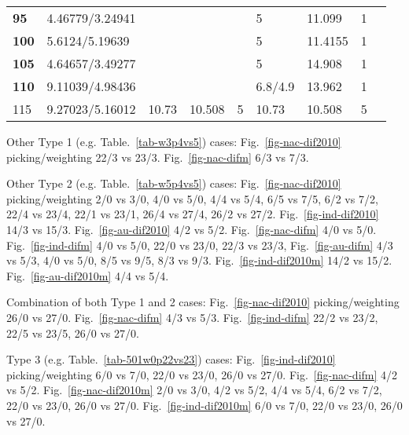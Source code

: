 \begin{table*}
\begin{tabular}{|l|l|l|l|l|l|l|l|l|l}
\textbf{95} & 4.46779/3.24941 & \multicolumn{3}{l|}{} & 5 & 11.099 & 1 & \multicolumn{2}{l|}{} \\ \cline{1-2} \cline{6-8}
\textbf{100} & 5.6124/5.19639 & \multicolumn{3}{l|}{} & 5 & 11.4155 & 1 & \multicolumn{2}{l|}{} \\ \cline{1-2} \cline{6-8}
\textbf{105} & 4.64657/3.49277 & \multicolumn{3}{l|}{} & 5 & 14.908 & 1 & \multicolumn{2}{l|}{} \\ \cline{1-2} \cline{6-8}
\textbf{110} & 9.11039/4.98436 & \multicolumn{3}{l|}{} & 6.8/4.9 & 13.962 & 1 & \multicolumn{2}{l|}{} \\ \cline{1-8}
115 & 9.27023/5.16012 & 10.73 & 10.508 & 5 & 10.73 & 10.508 & 5 & \multicolumn{2}{l|}{} \\ \cline{1-8}
\end{tabular}
\end{table*}

Other Type 1 (e.g. Table.~\ref{tab-w3p4vs5}) cases: Fig.~\ref{fig-nac-dif2010}
picking/weighting 22/3 vs 23/3. Fig.~\ref{fig-nac-difm} 6/3 vs 7/3.

Other Type 2 (e.g. Table.~\ref{tab-w5p4vs5}) cases: Fig.~\ref{fig-nac-dif2010}
picking/weighting 2/0 vs 3/0, 4/0 vs
5/0, 4/4 vs 5/4, 6/5 vs 7/5, 6/2 vs 7/2,
22/4 vs 23/4, 22/1 vs 23/1, 26/4 vs 27/4, 26/2 vs 27/2.
Fig.~\ref{fig-ind-dif2010} 14/3 vs 15/3. Fig.~\ref{fig-au-dif2010} 4/2 vs 5/2.
Fig.~\ref{fig-nac-difm} 4/0 vs 5/0.
Fig.~\ref{fig-ind-difm} 4/0 vs 5/0, 22/0 vs
23/0, 22/3 vs 23/3, Fig.~\ref{fig-au-difm}
4/3 vs 5/3, 4/0 vs 5/0, 8/5 vs 9/5, 8/3 vs 9/3. Fig.~\ref{fig-ind-dif2010m}
14/2 vs 15/2. Fig.~\ref{fig-au-dif2010m} 4/4 vs 5/4.

Combination of both Type 1 and 2 cases: Fig.~\ref{fig-nac-dif2010}
picking/weighting 26/0 vs 27/0. Fig.~\ref{fig-nac-difm}
4/3 vs 5/3. Fig.~\ref{fig-ind-difm} 22/2 vs 23/2, 22/5 vs 23/5, 26/0
vs 27/0.

Type 3 (e.g. Table.~\ref{tab-501w0p22vs23}) cases: Fig.~\ref{fig-ind-dif2010}
picking/weighting 6/0 vs 7/0, 22/0 vs
23/0, 26/0 vs 27/0. Fig.~\ref{fig-nac-difm}
4/2 vs 5/2. Fig.~\ref{fig-nac-dif2010m} 2/0
vs 3/0, 4/2 vs 5/2, 4/4 vs 5/4, 6/2 vs 7/2, 22/0 vs
23/0, 26/0 vs 27/0.
Fig.~\ref{fig-ind-dif2010m} 6/0 vs 7/0, 22/0
vs 23/0, 26/0 vs 27/0.

